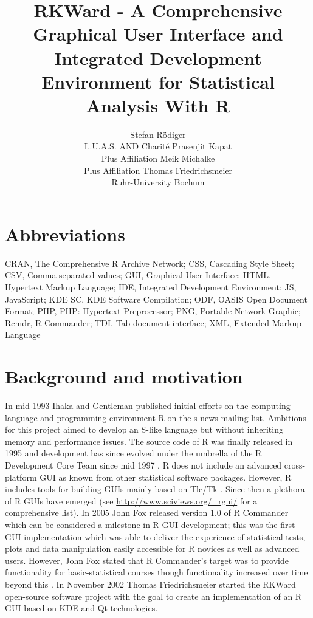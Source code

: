 \documentclass[article,shortnames]{jss}
\author{Stefan R\"odiger\\L.U.A.S. AND Charit\'e
	\And Prasenjit Kapat\\Plus Affiliation
	\And Meik Michalke\\Plus Affiliation
	\And Thomas Friedrichsmeier\\Ruhr-University Bochum}
\title{RKWard - A Comprehensive Graphical User Interface and Integrated Development Environment for Statistical Analysis With {R}}
\begin{document}

\section[Abbreviations]{Abbreviations}
CRAN, The Comprehensive R Archive Network; CSS, Cascading Style Sheet;
CSV, Comma separated values; GUI, Graphical User Interface; HTML,
Hypertext Markup Language; IDE, Integrated Development Environment; JS,
JavaScript; KDE SC, KDE Software Compilation; ODF, OASIS Open Document
Format; PHP, PHP: Hypertext Preprocessor; PNG, Portable Network
Graphic; Rcmdr, R Commander; TDI, Tab document interface; XML, Extended
Markup Language

\section[Background and motivation]{Background and motivation}
In mid 1993 Ihaka and Gentleman published initial efforts on the computing
language and programming environment R on the s-news mailing list. Ambitions for
this project aimed to develop an S-like language but without inheriting memory
and performance issues. The source code of R was finally released in 1995 and
development has since evolved under the umbrella of the R Development Core Team
since mid 1997 \citep{RDCT2001, RDCT2010, Ihaka_Gentlemen_1993}.
R does not include an advanced cross-platform GUI as known from other
statistical software packages. However, R includes tools for building GUIs
mainly based on Tlc/Tk \citep{Dalgaard2001, Dalgaard2002}. Since then a
plethora of R GUIs have emerged (see \url{http://www.sciviews.org/_rgui/} for a
comprehensive list). In 2005 John Fox released version 1.0 of R Commander which
can be considered a milestone in R GUI development; this was the first GUI
implementation which was able to deliver the experience of statistical tests,
plots and data manipulation easily accessible for R novices as well as advanced
users. However, John Fox stated that R Commander's target was to provide
functionality for basic-statistical courses though functionality increased over
time beyond this \citep{Fox2005}. In November 2002 Thomas Friedrichsmeier
started the RKWard open-source software project with the goal to create an
implementation of an R GUI based on KDE and Qt technologies.
\end{document}
